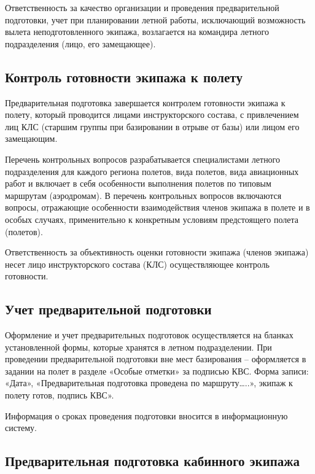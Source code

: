 Ответственность за качество организации и проведения предварительной подготовки, учет при планировании летной работы, исключающий возможность вылета неподготовленного экипажа, возлагается на командира летного подразделения (лицо, его замещающее).

 


\subsection{Контроль готовности экипажа к полету}
\setcounter{subsect}{1}

Предварительная подготовка завершается контролем готовности экипажа к полету, который проводится лицами инструкторского состава, с привлечением лиц КЛС (старшим группы при базировании в отрыве от базы) или лицом его замещающим.

Перечень контрольных вопросов разрабатывается специалистами летного подразделения для каждого региона полетов, вида полетов, вида авиационных работ и включает в себя особенности выполнения полетов по типовым маршрутам (аэродромам). В перечень контрольных вопросов включаются вопросы, отражающие особенности взаимодействия членов экипажа в полете и в особых случаях, применительно к конкретным условиям предстоящего полета (полетов). 

Ответственность за объективность оценки готовности экипажа (членов экипажа) несет лицо инструкторского состава (КЛС) осуществляющее контроль готовности.

\subsection{Учет предварительной подготовки}
\setcounter{subsect}{1}

Оформление и учет предварительных подготовок осуществляется на бланках установленной формы, которые хранятся в летном подразделении. При проведении предварительной подготовки вне мест базирования – оформляется в задании на полет в разделе «Особые отметки» за подписью КВС. Форма записи: «Дата», «Предварительная подготовка проведена по маршруту…..», экипаж к полету готов, подпись КВС».

Информация о сроках проведения подготовки вносится в информационную систему.

\subsection{Предварительная подготовка кабинного экипажа}
\setcounter{subsect}{1}

